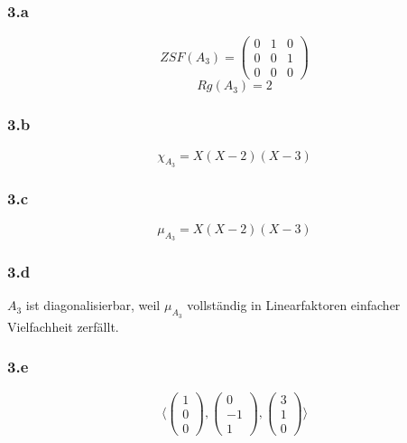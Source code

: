 \documentclass[10pt,a4paper]{article}
\begin{document}
\subsubsection*{3.a}

\begin{equation}
ZSF(A_{3}) = 
\begin{pmatrix}
0 & 1 & 0\\
0 & 0 & 1\\
0 & 0 & 0
\end{pmatrix}
\end{equation}
\begin{equation}
Rg(A_{3}) = 2
\end{equation}

\subsubsection*{3.b}

\begin{equation}
\chi_{A_{3}} = X(X-2)(X-3)
\end{equation}

\subsubsection*{3.c}

\begin{equation}
\mu_{A_{3}} = X(X-2)(X-3)
\end{equation}

\subsubsection*{3.d}

$A_{3}$ ist diagonalisierbar, weil $\mu_{A_{3}}$ vollständig in Linearfaktoren einfacher Vielfachheit zerfällt.

\subsubsection*{3.e}

\begin{equation}
\langle
\begin{pmatrix}
1\\0\\0
\end{pmatrix},
\begin{pmatrix}
0\\-1\\1
\end{pmatrix},
\begin{pmatrix}
3\\1\\0
\end{pmatrix}
\rangle
\end{equation}
\end{document}
